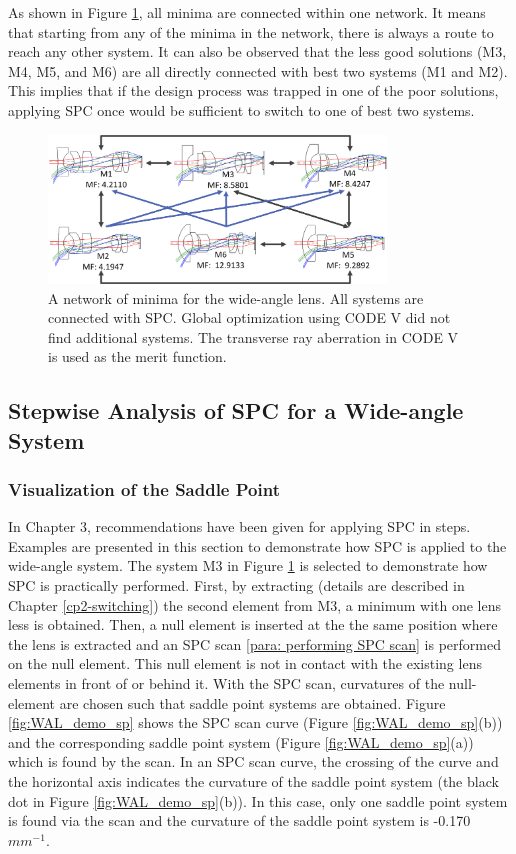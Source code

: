 As shown in Figure \ref{fig:WAL_network}, all minima are connected within one network. It means that starting from any of the minima in the network, there is always a route to reach any other system. It can also be observed that the less good solutions (M3, M4, M5, and M6) are all directly connected with best two systems (M1 and M2). This implies that if the design process was trapped in one of the poor solutions, applying SPC once would be sufficient to switch to one of best two systems.  

\begin{figure}[h!]
    \centering
    \includegraphics[width=0.8\textwidth]{chapter-4/figures/WAL_network.png}
    \caption{A network of minima for the wide-angle lens. All systems are connected with SPC. Global optimization using CODE V did not find additional systems. The transverse ray aberration in CODE V is used as the merit function.}
    \label{fig:WAL_network}
\end{figure}

\subsection{Stepwise Analysis of SPC for a Wide-angle System}
\subsubsection{Visualization of the Saddle Point }
In Chapter 3, recommendations have been given for applying SPC in steps. Examples are presented in this section to demonstrate how SPC is applied to the wide-angle system. The system M3 in Figure \ref{fig:WAL_network} is selected to demonstrate how SPC is practically performed. First, by extracting (details are described in Chapter \ref{cp2-switching}) the second element from M3, a minimum with one lens less is obtained. Then, a null element is inserted at the the same position where the lens is extracted and an SPC scan \ref{para: performing SPC scan} is performed on the null element. This null element is not in contact with the existing lens elements in front of or behind it.  With the SPC scan, curvatures of the null-element are chosen such that saddle point systems are obtained. Figure \ref{fig:WAL_demo_sp} shows the SPC scan curve (Figure \ref{fig:WAL_demo_sp}(b)) and the corresponding saddle point system (Figure \ref{fig:WAL_demo_sp}(a)) which is found by the scan. In an SPC scan curve, the crossing of the curve and the horizontal axis indicates the curvature of the saddle point system (the black dot in Figure \ref{fig:WAL_demo_sp}(b)). In this case, only one saddle point system is found via the scan and the curvature of the saddle point system is -0.170 $mm^{-1}$. 


